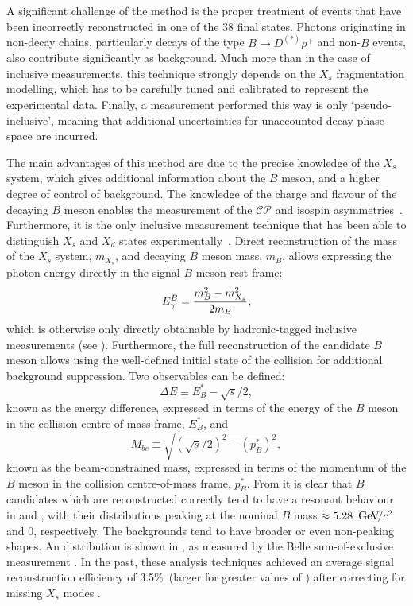 A significant challenge of the method is the proper treatment of \BtoXsgamma events that have been incorrectly reconstructed in one of the 38 final states.
Photons originating in non-\BtoXsgamma decay chains, particularly decays of the type $B\to D^{(*)}\rho^+$ and non-$B$ events, also contribute significantly as background.
Much more than in the case of inclusive measurements, this technique strongly depends on the $X_s$ fragmentation modelling, which has to be carefully tuned and calibrated to represent the experimental data.
Finally, a measurement performed this way is only `pseudo-inclusive', meaning that additional uncertainties for unaccounted decay phase space are incurred.


The main advantages of this method are due to the precise knowledge of the $X_s$ system, which gives additional information about the $B$ meson, and a higher degree of control of background.
The knowledge of the charge and flavour of the decaying $B$ meson enables the measurement of the $\mathcal{CP}$ and isospin asymmetries~\cite{BaBar:2014czi}.
Furthermore, it is the only inclusive measurement technique that has been able to distinguish $X_s$ and $X_d$ states experimentally~\cite{BaBar:2010vgu}.
Direct reconstruction of the mass of the $X_s$ system, $m_{X_s}$, and decaying $B$ meson mass, $m_B$, allows expressing the photon energy directly in the signal $B$ meson rest frame:
\begin{equation}\label{eq:mx_egamma_relation}
    {\ensuremath{E^B_{\gamma}}} = \frac{m_B^2 - m_{X_s}^2}{2m_B},
\end{equation}
which is otherwise only directly obtainable by hadronic-tagged inclusive measurements (see ).
Furthermore, the full reconstruction of the candidate $B$ meson allows using the well-defined initial state of the \epem collision for additional background suppression.
Two observables can be defined:
\begin{equation}\label{eq:deltae_inclusive}
    \Delta E \equiv E^*_B - \sqrt{s}/2,
\end{equation}
known as the energy difference, expressed in terms of the energy of the $B$ meson in the collision centre-of-mass frame, $E^*_B$, and
\begin{equation}\label{eq:mbc_exclusive}
    M_{bc} \equiv \sqrt{(\sqrt{s}/2)^2 - (p^*_B)^2},
\end{equation}
known as the beam-constrained mass, expressed in terms of the momentum of the $B$ meson in the collision centre-of-mass frame, $p^*_B$.
From  it is clear that $B$ candidates which are reconstructed correctly tend to have a resonant behaviour in \Mbc and \DeltaE, with their distributions peaking at the nominal $B$ mass $\approx5.28~{\mathrm{\,Ge\kern -0.1em V\!/}c^2}$ and $0$, respectively.
The backgrounds tend to have broader or even non-peaking shapes. 
An \Mbc distribution is shown in , as measured by the Belle sum-of-exclusive measurement \cite{Belle:2014nmp}.
In the past, these analysis techniques achieved an average signal reconstruction efficiency of 3.5\%~(larger for greater values of \EB) after correcting for missing $X_s$ modes \cite{Belle:2014nmp}.

